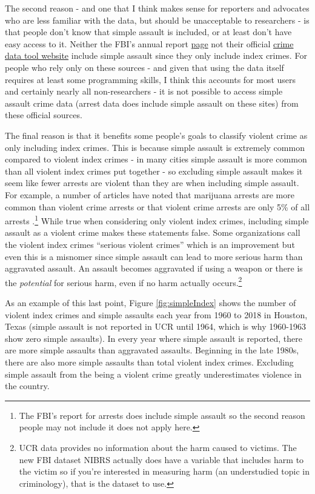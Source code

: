 \documentclass[
  12pt,
  openany]{book}
\begin{document}
The second reason - and one that I think makes sense for reporters and advocates who are less familiar with the data, but should be unacceptable to researchers - is that people don't know that simple assault is included, or at least don't have easy access to it. Neither the FBI's annual report \href{https://ucr.fbi.gov/crime-in-the-u.s/2019/crime-in-the-u.s.-2019/home}{page} not their official \href{https://crime-data-explorer.fr.cloud.gov/}{crime data tool website} include simple assault since they only include index crimes. For people who rely only on these sources - and given that using the data itself requires at least some programming skills, I think this accounts for most users and certainly nearly all non-researchers - it is not possible to access simple assault crime data (arrest data does include simple assault on these sites) from these official sources.

The final reason is that it benefits some people's goals to classify violent crime as only including index crimes. This is because simple assault is extremely common compared to violent index crimes - in many cities simple assault is more common than all violent index crimes put together - so excluding simple assault makes it seem like fewer arrests are violent than they are when including simple assault. For example, a number of articles have noted that marijuana arrests are more common than violent crime arrests \citep{ingraham2016, kertscher2019, devito2020, earlenbaugh2020, aclu2020} or that violent crime arrests are only 5\% of all arrests \citep{neusteter2019every, speri2019}.\footnote{The FBI's report for arrests does include simple assault so the second reason people may not include it does not apply here.} While true when considering only violent index crimes, including simple assault as a violent crime makes these statements false. Some organizations call the violent index crimes ``serious violent crimes'' which is an improvement but even this is a misnomer since simple assault can lead to more serious harm than aggravated assault. An assault becomes aggravated if using a weapon or there is the \emph{potential} for serious harm, even if no harm actually occurs.\footnote{UCR data provides no information about the harm caused to victims. The new FBI dataset NIBRS actually does have a variable that includes harm to the victim so if you're interested in measuring harm (an understudied topic in criminology), that is the dataset to use.}

As an example of this last point, Figure \ref{fig:simpleIndex} shows the number of violent index crimes and simple assaults each year from 1960 to 2018 in Houston, Texas (simple assault is not reported in UCR until 1964, which is why 1960-1963 show zero simple assaults). In every year where simple assault is reported, there are more simple assaults than aggravated assaults. Beginning in the late 1980s, there are also more simple assaults than total violent index crimes. Excluding simple assault from the being a violent crime greatly underestimates violence in the country.
\end{document}
